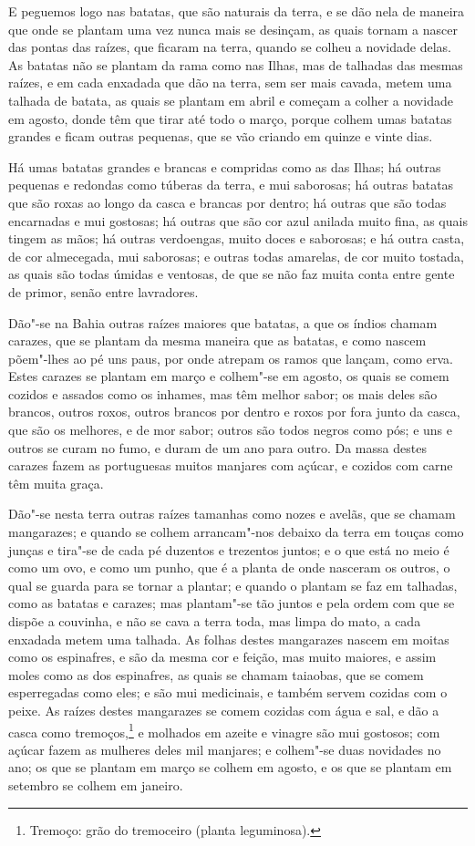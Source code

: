 E peguemos logo nas batatas, que são naturais da terra, e se dão nela de maneira que onde
se plantam uma vez nunca mais se desinçam, as quais tornam a nascer das pontas das raízes,
que ficaram na terra, quando se colheu a novidade delas. As batatas não se plantam da rama
como nas Ilhas, mas de talhadas das mesmas raízes, e em cada enxadada que dão na terra,
sem ser mais cavada, metem uma talhada de batata, as quais se plantam em abril e começam a
colher a novidade em agosto, donde têm que tirar até todo o março, porque colhem umas
batatas grandes e ficam outras pequenas, que se vão criando em quinze e vinte dias.

Há umas batatas grandes e brancas e compridas como as das Ilhas; há outras pequenas e
redondas como túberas da terra, e mui saborosas; há outras batatas que são roxas ao longo
da casca e brancas por dentro; há outras que são todas encarnadas e mui gostosas; há
outras que são cor azul anilada muito fina, as quais tingem as mãos; há outras verdoengas,
muito doces e saborosas; e há outra casta, de cor almecegada, mui saborosas; e outras
todas amarelas, de cor muito tostada, as quais são todas úmidas e ventosas, de que se não
faz muita conta entre gente de primor, senão entre lavradores.

Dão"-se na Bahia outras raízes maiores que batatas, a que os índios chamam carazes, que se
plantam da mesma maneira que as batatas, e como nascem põem"-lhes ao pé uns paus, por onde
atrepam os ramos que lançam, como erva. Estes carazes se plantam em março e colhem"-se em
agosto, os quais se comem cozidos e assados como os inhames, mas têm melhor sabor; os mais
deles são brancos, outros roxos, outros brancos por dentro e roxos por fora junto da
casca, que são os melhores, e de mor sabor; outros são todos negros como pós; e uns e
outros se curam no fumo, e duram de um ano para outro. Da massa destes carazes fazem as
portuguesas muitos manjares com açúcar, e cozidos com carne têm muita graça.

Dão"-se nesta terra outras raízes tamanhas como nozes e avelãs, que se chamam mangarazes; e
quando se colhem arrancam"-nos debaixo da terra em touças como junças e tira"-se de cada pé
duzentos e trezentos juntos; e o que está no meio é como um ovo, e como um punho, que é a
planta de onde nasceram os outros, o qual se guarda para se tornar a plantar; e quando o
plantam se faz em talhadas, como as batatas e carazes; mas plantam"-se tão juntos e pela
ordem com que se dispõe a couvinha, e não se cava a terra toda, mas limpa do mato, a cada
enxadada metem uma talhada. As folhas destes mangarazes nascem em moitas como os
espinafres, e são da mesma cor e feição, mas muito maiores, e assim moles como as dos
espinafres, as quais se chamam taiaobas, que se comem esperregadas como eles; e são mui
medicinais, e também servem cozidas com o peixe. As raízes destes mangarazes se comem
cozidas com água e sal, e dão a casca como tremoços,\footnote{ Tremoço: grão do tremoceiro
(planta leguminosa).} e molhados em azeite e vinagre são mui gostosos; com açúcar fazem as
mulheres deles mil manjares; e colhem"-se duas novidades no ano; os que se plantam em março
se colhem em agosto, e os que se plantam em setembro se colhem em janeiro.

